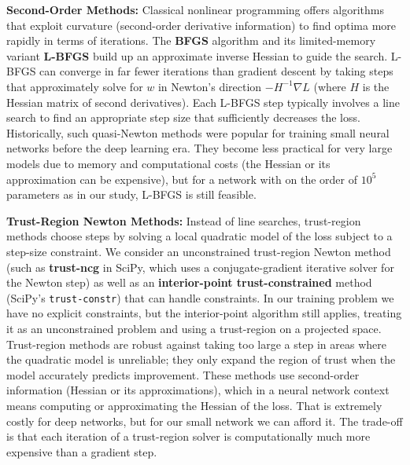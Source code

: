 \documentclass[12pt]{article}
\begin{document}
\textbf{Second-Order Methods:} Classical nonlinear programming offers algorithms that exploit curvature (second-order derivative information) to find optima more rapidly in terms of iterations. The \textbf{BFGS} algorithm and its limited-memory variant \textbf{L-BFGS} \cite{Nocedal1989LBFGS} build up an approximate inverse Hessian to guide the search. L-BFGS can converge in far fewer iterations than gradient descent by taking steps that approximately solve for $w$ in Newton’s direction $-H^{-1}\nabla L$ (where $H$ is the Hessian matrix of second derivatives). Each L-BFGS step typically involves a line search to find an appropriate step size that sufficiently decreases the loss. Historically, such quasi-Newton methods were popular for training small neural networks before the deep learning era. They become less practical for very large models due to memory and computational costs (the Hessian or its approximation can be expensive), but for a network with on the order of $10^5$ parameters as in our study, L-BFGS is still feasible.

\textbf{Trust-Region Newton Methods:} Instead of line searches, trust-region methods choose steps by solving a local quadratic model of the loss subject to a step-size constraint. We consider an unconstrained trust-region Newton method (such as \textbf{trust-ncg} in SciPy, which uses a conjugate-gradient iterative solver for the Newton step) as well as an \textbf{interior-point trust-constrained} method (SciPy’s \texttt{trust-constr}) that can handle constraints. In our training problem we have no explicit constraints, but the interior-point algorithm still applies, treating it as an unconstrained problem and using a trust-region on a projected space. Trust-region methods are robust against taking too large a step in areas where the quadratic model is unreliable; they only expand the region of trust when the model accurately predicts improvement. These methods use second-order information (Hessian or its approximations), which in a neural network context means computing or approximating the Hessian of the loss. That is extremely costly for deep networks, but for our small network we can afford it. The trade-off is that each iteration of a trust-region solver is computationally much more expensive than a gradient step.
\end{document}
